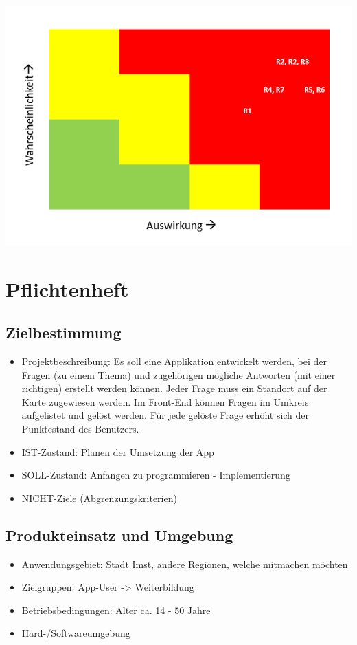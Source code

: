 \begin{center}
	\includegraphics[width=0.7\linewidth]{risiko2}
\end{center}


\section{Pflichtenheft}
\subsection{Zielbestimmung}
\begin{itemize}
	\item Projektbeschreibung: Es soll eine Applikation entwickelt werden, bei der Fragen (zu einem Thema) und zugehörigen mögliche Antworten (mit einer richtigen) erstellt werden können. Jeder Frage muss ein Standort auf der Karte zugewiesen werden. 
	Im Front-End können Fragen im Umkreis aufgelistet und gelöst werden. Für jede gelöste Frage erhöht sich der Punktestand des Benutzers.  
	\item IST-Zustand: Planen der Umsetzung der App
	\item SOLL-Zustand: Anfangen zu programmieren - Implementierung
	\item NICHT-Ziele (Abgrenzungskriterien)
\end{itemize}

\subsection{Produkteinsatz und Umgebung}
\begin{itemize}
	\item Anwendungsgebiet: Stadt Imst, andere Regionen, welche mitmachen möchten
	\item Zielgruppen: App-User -> Weiterbildung
	\item Betriebsbedingungen: Alter ca. 14 - 50 Jahre
	\item Hard-/Softwareumgebung
\end{itemize}
